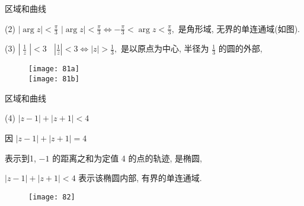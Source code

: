 \documentclass{beamer}
\begin{document}
\begin{frame}{区域和曲线}
\begin{block}{}
\begin{minipage}[t]{0.5\linewidth}
(2) $ \left| {\arg z} \right| < \frac{\pi }{3} $ 
 $ \left| {\arg z} \right| < \frac{\pi }{3} \Leftrightarrow - \frac{\pi }{3} < \arg z < \frac{\pi }{3}, $ 是角形域, 无界的单连通域(如图).
\vspace{25mm}

(3) $ \left| {\; \frac{1}{z}\; } \right| < 3 ~~~~ \left| \frac{1}{z} \right| < 3 \Leftrightarrow \left| z \right| > \frac{1}{3}, $ 
是以原点为中心, 半径为 $ \frac{{1}}{{3}} $ 的圆的外部, 
\end{minipage}\qquad\qquad
\begin{minipage}[t]{0.15\linewidth}
\begin{figure}\vspace{-3mm}\centering
\texttt{[image: 81a]}\\
\texttt{[image: 81b]}\\
\end{figure}
\end{minipage}

\end{block}

\end{frame}

\begin{frame}{区域和曲线}
\begin{block}{}
(4) $ \left| {z - 1} \right| + \left| {z + 1} \right| < 4 $ 

因 $ \left| {z - 1} \right| + \left| {z + 1} \right| = 4 $ 

表示到1,  $ -1 $ 的距离之和为定值 4 的点的轨迹, 是椭圆, 

 $ \left| {z - 1} \right| + \left| {z + 1} \right| < 4 $ 表示该椭圆内部, 有界的单连通域.

\begin{figure}
	\texttt{[image: 82]}
\end{figure}
\end{block}


\end{frame}
\end{document}
